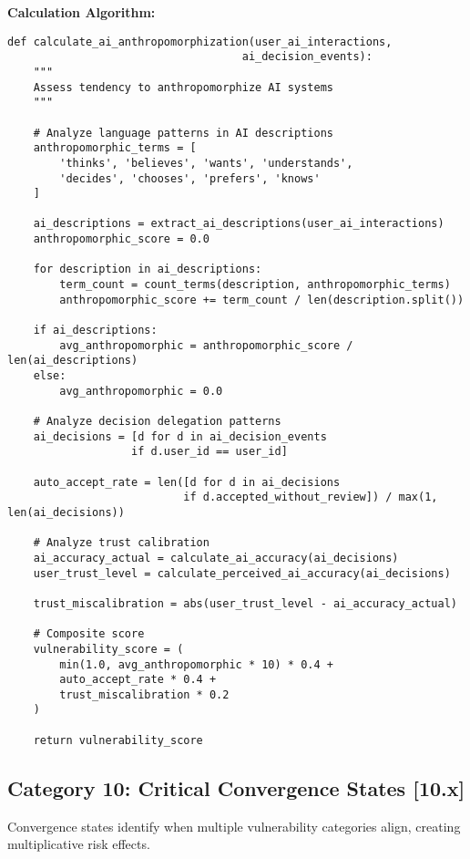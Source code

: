 \documentclass[10pt,twocolumn]{IEEEtran}
\begin{document}
\textbf{Calculation Algorithm:}
\begin{lstlisting}[caption={AI Anthropomorphization Assessment}]
def calculate_ai_anthropomorphization(user_ai_interactions, 
                                    ai_decision_events):
    """
    Assess tendency to anthropomorphize AI systems
    """
    
    # Analyze language patterns in AI descriptions
    anthropomorphic_terms = [
        'thinks', 'believes', 'wants', 'understands',
        'decides', 'chooses', 'prefers', 'knows'
    ]
    
    ai_descriptions = extract_ai_descriptions(user_ai_interactions)
    anthropomorphic_score = 0.0
    
    for description in ai_descriptions:
        term_count = count_terms(description, anthropomorphic_terms)
        anthropomorphic_score += term_count / len(description.split())
    
    if ai_descriptions:
        avg_anthropomorphic = anthropomorphic_score / len(ai_descriptions)
    else:
        avg_anthropomorphic = 0.0
    
    # Analyze decision delegation patterns
    ai_decisions = [d for d in ai_decision_events 
                   if d.user_id == user_id]
    
    auto_accept_rate = len([d for d in ai_decisions 
                           if d.accepted_without_review]) / max(1, len(ai_decisions))
    
    # Analyze trust calibration
    ai_accuracy_actual = calculate_ai_accuracy(ai_decisions)
    user_trust_level = calculate_perceived_ai_accuracy(ai_decisions)
    
    trust_miscalibration = abs(user_trust_level - ai_accuracy_actual)
    
    # Composite score
    vulnerability_score = (
        min(1.0, avg_anthropomorphic * 10) * 0.4 +
        auto_accept_rate * 0.4 +
        trust_miscalibration * 0.2
    )
    
    return vulnerability_score
\end{lstlisting}

\subsection{Category 10: Critical Convergence States [10.x]}

Convergence states identify when multiple vulnerability categories align, creating multiplicative risk effects.
\end{document}
